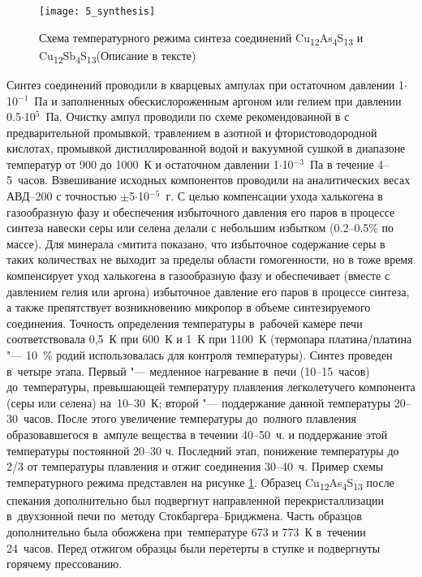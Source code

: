 \begin{figure}[pt!]
  \begin{minipage}[ht]{0.99\linewidth}\centering
    \texttt{[image: 5\_synthesis]}
  \end{minipage}
       \caption[Схема температурного режима синтеза соединений Cu\textsubscript{12}As\textsubscript{4}S\textsubscript{13} и Cu\textsubscript{12}Sb\textsubscript{4}S\textsubscript{13}]{Схема температурного режима синтеза соединений Cu\textsubscript{12}As\textsubscript{4}S\textsubscript{13} и Cu\textsubscript{12}Sb\textsubscript{4}S\textsubscript{13}(Описание в тексте)}
    \label{img:figure3}
\end{figure}

Синтез соединений проводили в кварцевых ампулах при остаточном давлении 1$\cdot$10$^{-1}$~Па и заполненных обескислороженным аргоном или гелием при давлении 0.5$\cdot$10$^{5}$~Па. Очистку ампул проводили по схеме рекомендованной в \cite{156} с предварительной промывкой, травлением в азотной и фтористоводородной кислотах, промывкой дистиллированной водой и вакуумной сушкой в диапазоне температур от 900 до 1000~К и остаточном давлении 1$\cdot$10$^{-3}$~Па в течение 4--5~часов. Взвешивание исходных компонентов проводили на аналитических весах АВД--200 с точностью $\pm$5$\cdot$10$^{-5}$~г.
С целью компенсации ухода халькогена в газообразную фазу и обеспечения избыточного давления его паров в процессе синтеза навески серы или селена делали с небольшим избытком (0.2--0.5\% по массе).
Для минерала cмитита показано\cite{181}, что избыточное содержание серы в таких количествах не выходит за пределы области гомогенности, но в тоже время компенсирует уход халькогена в газообразную фазу и обеспечивает (вместе с давлением гелия или аргона) избыточное давление его паров в процессе синтеза, а также препятствует возникновению микропор в объеме синтезируемого соединения.
Точность определения температуры в~рабочей камере печи соответствовала 0,5~К при 600~К и 1~К при 1100~К (термопара платина/платина "--- 10~\% родий использовалась для контроля температуры). Синтез проведен в~четыре этапа. Первый "--- медленное нагревание в~печи (10--15~часов) до~температуры, превышающей температуру плавления легколетучего компонента (серы или селена) на~10--30~К; второй "--- поддержание данной температуры 20--30~часов. После этого увеличение температуры до~полного плавления образовавшегося в~ампуле вещества в течении 40--50~ч. и поддержание этой температуры постоянной 20--30 ч. Последний этап, понижение температуры до 2/3 от температуры плавления и отжиг соединения 30--40~ч.
 Пример схемы температурного режима представлен на рисунке \ref{img:figure3}. Образец Cu\textsubscript{12}As\textsubscript{4}S\textsubscript{13} после спекания дополнительно был подвергнут направленной перекристаллизации в~двухзонной печи по~методу Стокбаргера--Бриджмена. Часть образцов дополнительно была обожжена при~температуре 673 и 773~К в~течении 24~часов.
Перед отжигом образцы были перетерты в ступке и подвергнуты горячему прессованию.

